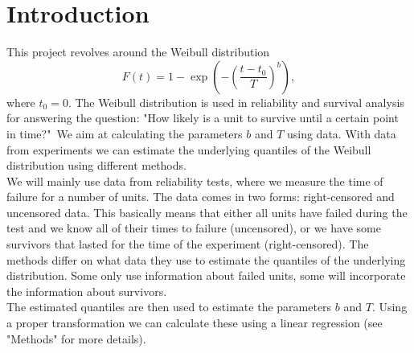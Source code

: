 \section{Introduction}

This project revolves around the Weibull distribution
$$ F(t) = 1 - \exp\left(- \left( \frac{t - t_0}{T}\right)^b\right), $$
where $t_0 = 0$. The Weibull distribution is used in reliability and survival analysis for answering the question: "How likely is a unit to survive until a certain point in time?"\ We aim at calculating the parameters $b$ and $T$ using data. With data from experiments 
we can estimate the underlying quantiles of the Weibull distribution using different methods.\\
We will mainly use data from reliability tests, where we measure the time of failure for a number of units. The data comes in two forms: right-censored and uncensored data. This basically means that either all units have failed during the test and we know all of their times to failure (uncensored), or we have some survivors that lasted for the time of the experiment (right-censored). The methods differ on what data they use to estimate the quantiles of the underlying distribution. Some only use information about failed units, some will incorporate the information about survivors.\\
The estimated quantiles are then used to estimate the parameters $b$ and $T$. Using a proper transformation we can calculate these using a linear regression (see "Methods" for more details).